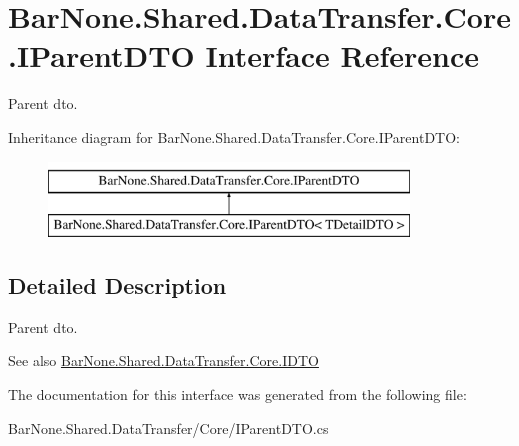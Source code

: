 \hypertarget{interface_bar_none_1_1_shared_1_1_data_transfer_1_1_core_1_1_i_parent_d_t_o}{}\section{Bar\+None.\+Shared.\+Data\+Transfer.\+Core.\+I\+Parent\+D\+TO Interface Reference}
\label{interface_bar_none_1_1_shared_1_1_data_transfer_1_1_core_1_1_i_parent_d_t_o}


Parent dto.  


Inheritance diagram for Bar\+None.\+Shared.\+Data\+Transfer.\+Core.\+I\+Parent\+D\+TO\+:\begin{figure}[H]
\begin{center}
\leavevmode
\includegraphics[height=2.000000cm]{interface_bar_none_1_1_shared_1_1_data_transfer_1_1_core_1_1_i_parent_d_t_o}
\end{center}
\end{figure}


\subsection{Detailed Description}
Parent dto. 

\begin{DoxySeeAlso}{See also}
\mbox{\hyperlink{interface_bar_none_1_1_shared_1_1_data_transfer_1_1_core_1_1_i_d_t_o}{Bar\+None.\+Shared.\+Data\+Transfer.\+Core.\+I\+D\+TO}}


\end{DoxySeeAlso}


The documentation for this interface was generated from the following file\+:\begin{DoxyCompactItemize}
\item 
Bar\+None.\+Shared.\+Data\+Transfer/\+Core/I\+Parent\+D\+T\+O.\+cs\end{DoxyCompactItemize}

